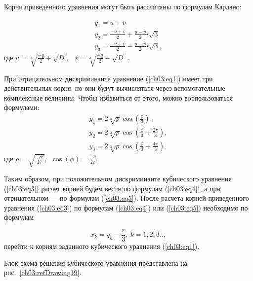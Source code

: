 Корни приведенного уравнения могут быть рассчитаны по формулам Кардано:

\begin{equation}\label{ch03:eq4}
\begin{array}{l}
y_1=u+v\\
y_2=\frac{-{u+v}}{2}+\frac{u-v}{2}i\sqrt{3}\\
y_3=\frac{-{u+v}}{2}-\frac{u-v}{2}i\sqrt{3},
\end{array}
\end{equation}
где $u=\sqrt[{3}]{\frac{-q}{2}+\sqrt{D}}$,\ \  $v=\sqrt[{3}]{\frac{-q}{2}-\sqrt{D}}$ .

При отрицательном дискриминанте уравнение (\ref{ch03:eq1}) имеет три действительных корня, но они будут вычисляться
через вспомогательные комплексные величины. Чтобы избавиться от этого, можно воспользоваться формулами:
\begin{equation}\label{ch03:eq5}
\begin{array}{l}
y_1=2\sqrt[{3}]{\rho}\cos(\frac{\phi}{3}),\\
y_2=2\sqrt[{3}]{\rho}\cos(\frac{\phi}{3}+\frac{2\pi}{3}),\\
y_3=2\sqrt[{3}]{\rho}\cos(\frac{\phi}{3}+\frac{4\pi}{3}),
\end{array}
\end{equation}
где $\rho =\sqrt{\frac{-{p^{3}}}{27}},\ \ \cos(\phi )=\frac{-{q}}{2\rho}$.

Таким образом, при положительном дискриминанте кубического уравнения (\ref{ch03:eq3}) расчет корней будем вести по
формулам (\ref{ch03:eq4}), а при отрицательном --- по формулам (\ref{ch03:eq5}). После расчета корней приведенного
уравнения (\ref{ch03:eq3}) по формулам (\ref{ch03:eq4}) или (\ref{ch03:eq5}) необходимо по формулам 

\begin{equation*}
x_{k}=y_{k}-\frac{r}{3},\ k=1,2,3..,
\end{equation*}
перейти к корням заданного кубического уравнения (\ref{ch03:eq1}).

Блок-схема решения кубического уравнения представлена на рис.~\ref{ch03:refDrawing19}.

